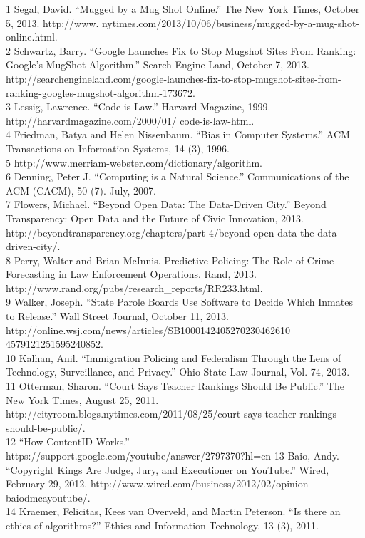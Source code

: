 1 Segal, David. ``Mugged by a Mug Shot Online.'' The New York Times, October 5, 2013. http://www. nytimes.com/2013/10/06/business/mugged-by-a-mug-shot-online.html.\\
2 Schwartz, Barry. ``Google Launches Fix to Stop Mugshot Sites From Ranking: Google's MugShot Algorithm.'' Search Engine Land, October 7, 2013. http://searchengineland.com/google-launches-fix-to-stop-mugshot-sites-from-ranking-googles-mugshot-algorithm-173672. \\
3 Lessig, Lawrence. ``Code is Law.'' Harvard Magazine, 1999. http://harvardmagazine.com/2000/01/ code-is-law-html. \\
4 Friedman, Batya and Helen Nissenbaum. ``Bias in Computer Systems.'' ACM Transactions on Information Systems, 14 (3), 1996. \\
5 http://www.merriam-webster.com/dictionary/algorithm. \\
6 Denning, Peter J. ``Computing is a Natural Science.'' Communications of the ACM (CACM), 50 (7). July, 2007. \\
7 Flowers, Michael. ``Beyond Open Data: The Data-Driven City.'' Beyond Transparency: Open Data and the Future of Civic Innovation, 2013. http://beyondtransparency.org/chapters/part-4/beyond-open-data-the-data-driven-city/. \\
8 Perry, Walter and Brian McInnis. Predictive Policing: The Role of Crime Forecasting in Law Enforcement Operations. Rand, 2013. http://www.rand.org/pubs/research_reports/RR233.html. \\
9 Walker, Joseph. ``State Parole Boards Use Software to Decide Which Inmates to Release.'' Wall Street Journal, October 11, 2013. http://online.wsj.com/news/articles/SB1000142405270230462610 4579121251595240852. \\
10 Kalhan, Anil. ``Immigration Policing and Federalism Through the Lens of Technology, Surveillance, and Privacy.'' Ohio State Law Journal, Vol. 74, 2013. \\
11 Otterman, Sharon. ``Court Says Teacher Rankings Should Be Public.'' The New York Times, August 25, 2011. http://cityroom.blogs.nytimes.com/2011/08/25/court-says-teacher-rankings-should-be-public/. \\
12 ``How ContentID Works.'' https://support.google.com/youtube/answer/2797370?hl=en 
13 Baio, Andy. ``Copyright Kings Are Judge, Jury, and Executioner on YouTube.'' Wired, February 29, 2012. http://www.wired.com/business/2012/02/opinion-baiodmcayoutube/. \\
14 Kraemer, Felicitas, Kees van Overveld, and Martin Peterson. ``Is there an ethics of algorithms?'' Ethics and Information Technology. 13 (3), 2011. \\
